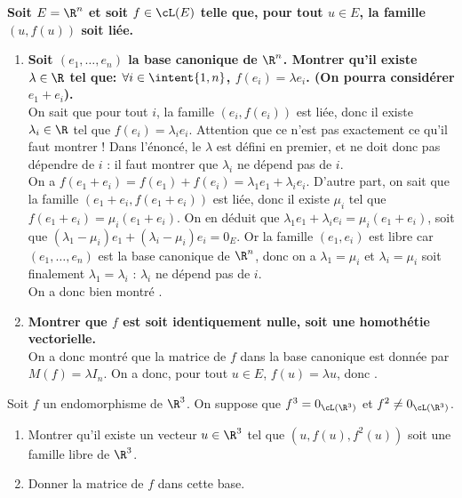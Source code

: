\documentclass[a4paper, 11pt,reqno]{article}
\begin{document}
\begin{correction}  \;
	\textbf{Soit $E=\R^n$ et soit $f\in\cL(E)$ telle que, pour tout $u\in E$, la famille $(u,f(u))$ soit li\'ee.}
	\begin{enumerate}
		\item \textbf{Soit $(e_1,\dots, e_n)$ la base canonique de $\R^n$. Montrer qu'il existe $\lambda\in\R$ tel que: $\forall i\in\intent{ 1,n}$, $f(e_i)=\lambda e_i$. (On pourra consid\'erer $e_1+e_i$).}\\
		      On sait que pour tout $i$, la famille $(e_i,f(e_i))$ est li\'ee, donc il existe $\lambda_i \in \R$ tel que $f(e_i) = \lambda_i e_i$. Attention que ce n'est pas exactement ce qu'il faut montrer ! Dans l'\'enonc\'e, le $\lambda$ est d\'efini en premier, et ne doit donc pas d\'ependre de $i$ : il faut montrer que $\lambda_i$ ne d\'epend pas de $i$.\\
		      On a $f(e_1+e_i)= f(e_1)+f(e_i) = \lambda_1 e_1+ \lambda_i e_i$. D'autre part, on sait que la famille $(e_1+e_i,f(e_1+e_i))$ est li\'ee, donc il existe $\mu_i$ tel que $f(e_1+e_i) = \mu_i (e_1+e_i)$. On en d\'eduit que $\lambda_1 e_1+ \lambda_i e_i =  \mu_i (e_1+e_i)$, soit que $(\lambda_1-\mu_i) e_1+ (\lambda_i-\mu_i)e_i = 0_E$. Or la famille $(e_1,e_i)$ est libre car $(e_1,\dots, e_n)$ est la base canonique de $\R^n$, donc on a $\lambda_1=\mu_i$ et $\lambda_i=\mu_i$ soit finalement $\lambda_1=\lambda_i$ : $\lambda_i$ ne d\'epend pas de $i$.\\
		      On a donc bien montr\'e .
		\item \textbf{Montrer que $f$ est soit identiquement nulle, soit une homoth\'etie vectorielle.}\\
		      On a donc montr\'e que la matrice de $f$ dans la base canonique est donn\'ee par $M(f) = \lambda I_n$. On a donc, pour tout $u\in E$, $f(u) = \lambda u$, donc .
	\end{enumerate}
\end{correction}
\begin{exercice}  \;
	Soit $f$ un endomorphisme de $\R^3$. On suppose que $f^3=0_{\cL(\R^3)}$ et $f^2\not= 0_{\cL(\R^3)}$.
	\begin{enumerate}
		\item Montrer qu'il existe un vecteur $u\in\R^3$ tel que $(u,f(u),f^2(u))$ soit une famille libre de $\R^3$.
		\item Donner la matrice de $f$ dans cette base.
	\end{enumerate}
\end{exercice}
\end{document}
